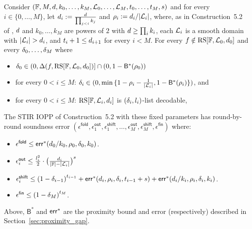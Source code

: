\begin{lemma}\label{lemma:rnd_by_rnd_soundness}
    Consider $(\mathbb{F},M,d,k_0,\ldots,k_M,\mathcal{L}_0,\ldots,\mathcal{L}_M,t_0,\ldots,t_M,s)$ and for every $i\in\{0,\ldots,M\}$, let $d_i:=\frac{d}{\prod_{j<i}k_j}$ and $\rho_i:=d_i/|\mathcal{L}_i|$, where, as in Construction~5.2 of \cite{ACFY24stir}, $d$ and $k_0,\ldots,k_M$ are powers of $2$ with $d\ge\prod_i k_i$, each $\mathcal{L}_i$ is a smooth domain with $|\evaldomain_i|>\degree_i$, and $t_i+1\le d_{i+1}$ for every $i<M$. For every $f\notin\mathrm{RS}[\mathbb{F},\mathcal{L}_0,d_0]$ and every $\delta_0,\ldots,\delta_M$ where
    \begin{itemize}
        \item $\delta_0\in(0,\Delta(f,\mathrm{RS}[\mathbb{F},\mathcal{L}_0,d_0])]\cap(0,1-{\mathsf{B}}^*(\rho_0))$
        \item for every $0<i\leq M$: $\delta_i\in(0,\min{\{1-\rho_i-\frac{1}{|\mathcal{L}_i|},1-{\mathsf{B}^*(\rho_i)}\}})$, and
        \item for every $0<i\leq M$: $\mathrm{RS}[\mathbb{F},\mathcal{L}_i,d_i]$ is $(\delta_i,l_i)$-list decodable,
    \end{itemize}
    The STIR IOPP of Construction~5.2 with these fixed parameters has round-by-round soundness error $(\epsilon^{\mathsf{fold}},\epsilon^{\mathsf{out}}_1,\epsilon^{\mathsf{shift}}_1,\ldots,\epsilon^{\mathsf{out}}_M,\epsilon^{\mathsf{shift}}_M,\epsilon^{\mathsf{fin}})$ where:
    \begin{itemize}
        \item $\epsilon^{\mathsf{fold}}\leq\mathsf{err}^*(d_0/k_0,\rho_0,\delta_0,k_0)$.
        \item $\epsilon^{\mathsf{out}}_i\leq\frac{l^2_i}{2}\cdot{\big(\frac{d_i}{|\mathbb{F}|-|\mathcal{L}_i|}\big)}^s$
        \item $\epsilon^{\mathsf{shift}}_i\leq {(1-\delta_{i-1})}^{t_{i-1}}+\mathsf{err}^*(d_i,\rho_i,\delta_i,t_{i-1}+s)+\mathsf{err}^*(d_i/k_i,\rho_i,\delta_i,k_i)$.
        \item $\epsilon^{\mathsf{fin}}\leq{(1-\delta_M)}^{t_M}$.
    \end{itemize}
    Above, ${\mathsf{B}}^*$ and ${\mathsf{err}}^*$ are the proximity bound and error (respectively) described in Section~\ref{sec:proximity_gap}.
\end{lemma}

